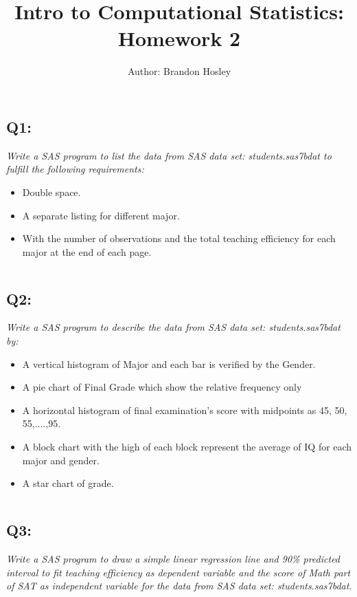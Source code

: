 \documentclass[a4paper,man,natbib]{apa6}
\title{Intro to Computational Statistics: Homework 2}
\author{Author: Brandon Hosley}
\affiliation{Instructor: Liang Kong, Ph.D}
\begin{document}
\maketitle
\singlespacing
	
\subsection*{Q1:}
\emph{Write a SAS program to list the data from SAS data set: students.sas7bdat to fulfill the following requirements:}
\begin{itemize}
	\itemsep-0.5em
	\item Double space.
	\item A separate listing for different major.
	\item With the number of observations and the total teaching efficiency for each major at the end of each page. 
\end{itemize}
	\inputminted[breaklines,bgcolor=light-gray]{sas}{./Snippets/DAT502-HW2-1.sas}

\vspace{-2em}
\subsection*{Q2:}
\emph{Write a SAS program to describe the data from SAS data set: students.sas7bdat by:}
\begin{itemize}
	\itemsep-0.5em
	\item A vertical histogram of Major and each bar is verified by the Gender.
	\item A pie chart of Final Grade which show the relative frequency only
	\item A horizontal histogram of final examination's score with midpoints as 45, 50, 55,....,95.
	\item A block chart with the high of each block represent the average of IQ for each major and gender.
	\item A star chart of grade.
\end{itemize}
	\inputminted[breaklines,bgcolor=light-gray]{sas}{./Snippets/DAT502-HW2-2.sas}

\subsection*{Q3:}
\emph{Write a SAS program to draw a simple linear regression line and 90\% predicted interval to fit teaching efficiency as dependent variable and the score of Math part of SAT as independent variable for the data from SAS data set: students.sas7bdat. }
	\inputminted[breaklines,bgcolor=light-gray]{sas}{./Snippets/DAT502-HW2-3.sas}
\end{document}
